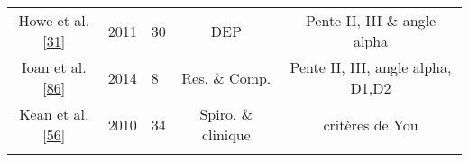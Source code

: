 \documentclass[12pt,]{article}
\begin{document}
\begin{landscape}
\begin{longtable}[]{@{}cllcc@{}}
\begin{minipage}[t]{0.31\columnwidth}
Howe et al.{[}\protect\hyperlink{ref-howe2011use}{31}{]}\strut
\end{minipage} & \begin{minipage}[t]{0.05\columnwidth}\raggedright
2011\strut
\end{minipage} & \begin{minipage}[t]{0.06\columnwidth}\raggedright
30\strut
\end{minipage} & \begin{minipage}[t]{0.12\columnwidth}\centering
DEP\strut
\end{minipage} & \begin{minipage}[t]{0.32\columnwidth}\centering
Pente II, III \& angle alpha\strut
\end{minipage}\tabularnewline
\begin{minipage}[t]{0.31\columnwidth}\centering
Ioan et al.{[}\protect\hyperlink{ref-ioan2014frequency}{86}{]}\strut
\end{minipage} & \begin{minipage}[t]{0.05\columnwidth}\raggedright
2014\strut
\end{minipage} & \begin{minipage}[t]{0.06\columnwidth}\raggedright
8\strut
\end{minipage} & \begin{minipage}[t]{0.12\columnwidth}\centering
Res. \& Comp.\strut
\end{minipage} & \begin{minipage}[t]{0.32\columnwidth}\centering
Pente II, III, angle alpha, D1,D2\strut
\end{minipage}\tabularnewline
\begin{minipage}[t]{0.31\columnwidth}\centering
Kean et al.{[}\protect\hyperlink{ref-kean2010feature}{56}{]}\strut
\end{minipage} & \begin{minipage}[t]{0.05\columnwidth}\raggedright
2010\strut
\end{minipage} & \begin{minipage}[t]{0.06\columnwidth}\raggedright
34\strut
\end{minipage} & \begin{minipage}[t]{0.12\columnwidth}\centering
Spiro. \& clinique\strut
\end{minipage} & \begin{minipage}[t]{0.32\columnwidth}\centering
8 critères de You\strut
\end{minipage}\tabularnewline
\begin{minipage}[t]{0.31\columnwidth}\centering

\end{minipage}
\end{longtable}
\end{landscape}
\end{document}
